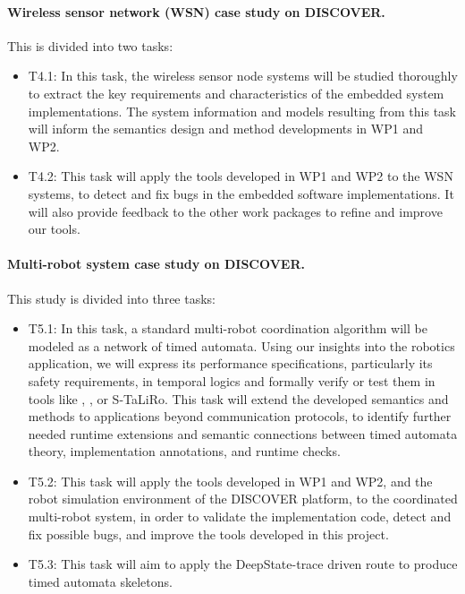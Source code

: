 \paragraph{Wireless sensor network (WSN) case study on DISCOVER.} This %
is divided into two tasks:
\noindent  \begin{itemize}[labelsep=3pt,leftmargin=12pt]
\item T4.1: In this task, the %
  wireless sensor node systems will be studied thoroughly to extract the key requirements and characteristics of the embedded system implementations.
  The system information and models resulting from this task will inform the semantics design and method developments in WP1 and WP2. 
\item T4.2: This task will apply the tools developed in WP1 and WP2 to the WSN systems, %
  to detect and fix bugs in
  the embedded software implementations. %
  It will also provide feedback to the other work packages to refine and improve our tools.
  \end{itemize}

\paragraph {Multi-robot system case study on DISCOVER.} This study is divided into three tasks:
\noindent \begin{itemize}[labelsep=3pt,leftmargin=12pt]
\item T5.1: In this task, a standard multi-robot coordination
  algorithm %
  will be modeled as a network of timed automata.  Using our insights
  into the robotics application, we will express its performance
  specifications, particularly its safety requirements, in temporal
  logics and formally verify or test them in tools like \uppaal,
  \prism, or S-TaLiRo.  This task will extend the developed semantics
  and methods to applications beyond communication protocols, to
  identify further needed runtime extensions and semantic connections
  between timed automata theory, implementation annotations, and
  runtime checks.
\item T5.2: This task will apply the tools developed in WP1 and WP2,
  and the robot simulation environment of the DISCOVER platform, to
  the coordinated multi-robot system, in order to validate the
  implementation code, detect and fix possible bugs, and improve
  the tools developed in this project.
\item T5.3: This task will aim to apply the DeepState-trace driven
  route to produce timed automata skeletons.
  \end{itemize}

